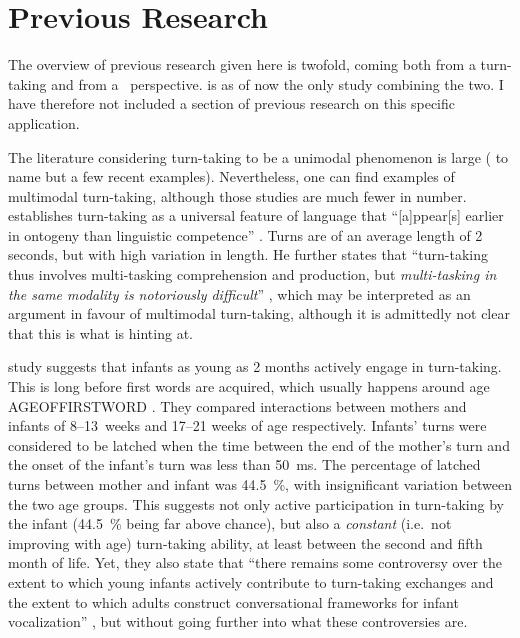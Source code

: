 \section{Previous Research}
\label{sec:introductionresearch}
The overview of previous research given here is twofold, coming both from a turn-taking and from a \fpmlower\ perspective.
\citet{rohlfing18} is as of now the only study combining the two.
I have therefore not included a section of previous research on this specific application.


The literature considering turn-taking to be a unimodal phenomenon is large (\citep{casillas16,freud16,heldner10} to name but a few recent examples).
Nevertheless, one can find examples of multimodal turn-taking, although those studies are much fewer in number.
\citet{levinson16} establishes turn-taking as a universal feature of language that ``[a]ppear[s] earlier in ontogeny than linguistic competence'' \citep[]{levinson16}.
Turns are of an average length of 2 seconds, but with high variation in length.
He further states that ``turn-taking thus involves multi-tasking comprehension and production, but \emph{multi-tasking in the same modality is notoriously difficult}'' \citep[, emphasis mine]{levinson16}, which may be interpreted as an argument in favour of multimodal turn-taking, although it is admittedly not clear that this is what \citeauthor{levinson16} is hinting at.%

 study suggests that infants as young as 2 months actively engage in turn-taking.
This is long before first words are acquired, which usually happens around age AGEOFFIRSTWORD \citep{nosource}.
 They compared interactions between mothers and infants of 8--13~weeks and 17--21 weeks of age respectively.
Infants' turns were considered to be latched when the time between the end of the mother's turn and the onset of the infant's turn was less than 50~ms.
The percentage of latched turns between mother and infant was 44.5~\%, with insignificant variation between the two age groups.
This suggests not only active participation in turn-taking by the infant (44.5~\% being far above chance), but also a \emph{constant} (i.e.\ not improving with age) turn-taking ability, at least between the second and fifth month of life.
Yet, they also state that ``there remains some controversy over the extent to which young infants actively contribute to turn-taking exchanges and the extent to which adults construct conversational frameworks for infant vocalization'' \citep[]{gratier15}, but without going further into what these controversies are.

